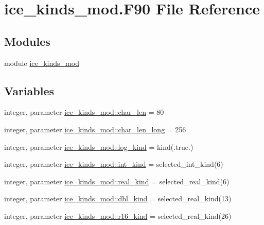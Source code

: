 \hypertarget{ice__kinds__mod_8F90}{
\section{ice\_\-kinds\_\-mod.F90 File Reference}
\label{ice__kinds__mod_8F90}
}
\subsection*{Modules}
\begin{DoxyCompactItemize}
\item 
module \hyperlink{namespaceice__kinds__mod}{ice\_\-kinds\_\-mod}
\end{DoxyCompactItemize}
\subsection*{Variables}
\begin{DoxyCompactItemize}
\item 
integer, parameter \hyperlink{namespaceice__kinds__mod_a7db314add8cff2a5e519342f0468d18d}{ice\_\-kinds\_\-mod::char\_\-len} = 80
\item 
integer, parameter \hyperlink{namespaceice__kinds__mod_ac0e6e7d330377449d5a1ad6fa9fc6a31}{ice\_\-kinds\_\-mod::char\_\-len\_\-long} = 256
\item 
integer, parameter \hyperlink{namespaceice__kinds__mod_aed396721758f7c268c34a610f26a5feb}{ice\_\-kinds\_\-mod::log\_\-kind} = kind(.true.)
\item 
integer, parameter \hyperlink{namespaceice__kinds__mod_aeda5fd1eefedcb096b1929d3c2ed46c8}{ice\_\-kinds\_\-mod::int\_\-kind} = selected\_\-int\_\-kind(6)
\item 
integer, parameter \hyperlink{namespaceice__kinds__mod_a66f2774e6096156e4fe5914003097c72}{ice\_\-kinds\_\-mod::real\_\-kind} = selected\_\-real\_\-kind(6)
\item 
integer, parameter \hyperlink{namespaceice__kinds__mod_af54ee31a38380cc4f477ba152ffef7d5}{ice\_\-kinds\_\-mod::dbl\_\-kind} = selected\_\-real\_\-kind(13)
\item 
integer, parameter \hyperlink{namespaceice__kinds__mod_ad334fc097ec7edf7543cd71a265c4680}{ice\_\-kinds\_\-mod::r16\_\-kind} = selected\_\-real\_\-kind(26)
\end{DoxyCompactItemize}
